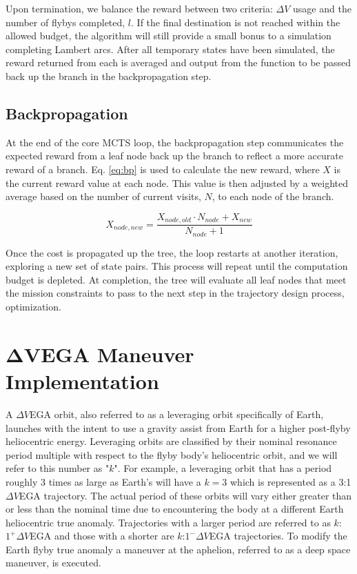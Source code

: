 \documentclass[letterpaper, preprint, paper,11pt]{AAS}	%
\begin{document}
Upon termination, we balance the reward between two criteria: $\Delta V$ usage and the number of flybys completed, $l$. If the final destination is not reached within the allowed budget, the algorithm will still provide a small bonus to a simulation completing Lambert arcs. After all temporary states have been simulated, the reward returned from each is averaged and output from the function to be passed back up the branch in the backpropagation step.

\subsection{Backpropagation}

At the end of the core MCTS loop, the backpropagation step communicates the expected reward from a leaf node back up the branch to reflect a more accurate reward of a branch. Eq. \eqref{eq:bp} is used to calculate the new reward, where $X$ is the current reward value at each node. This value is then adjusted by a weighted average based on the number of current visits, $N$, to each node of the branch.

\begin{equation}
    \label{eq:bp}
    X_{node, new} = \frac{X_{node, old} \cdot N_{node} + X_{new}}{N_{node} + 1}
\end{equation}

Once the cost is propagated up the tree, the loop restarts at another iteration, exploring a new set of state pairs. This process will repeat until the computation budget is depleted. At completion, the tree will evaluate all leaf nodes that meet the mission constraints to pass to the next step in the trajectory design process, optimization.

\section*{$\boldsymbol{\Delta V}$EGA Maneuver Implementation}

A $\Delta V$EGA orbit, also referred to as a leveraging orbit specifically of Earth, launches with the intent to use a gravity assist from Earth for a higher post-flyby heliocentric energy\cite{Hollenbeck}. Leveraging orbits are classified by their nominal resonance period multiple with respect to the flyby body's heliocentric orbit, and we will refer to this number as "$k$". For example, a leveraging orbit that has a period roughly 3 times as large as Earth's will have a $k=3$ which is represented as a 3:1 $\Delta V$EGA trajectory. The actual period of these orbits will vary either greater than or less than the nominal time due to encountering the body at a different Earth heliocentric true anomaly. Trajectories with a larger period are referred to as $k$:$1^{+} \Delta V$EGA and those with a shorter are $k$:$1^{-} \Delta V$EGA trajectories. To modify the Earth flyby true anomaly a maneuver at the aphelion, referred to as a deep space maneuver, is executed.
\end{document}
